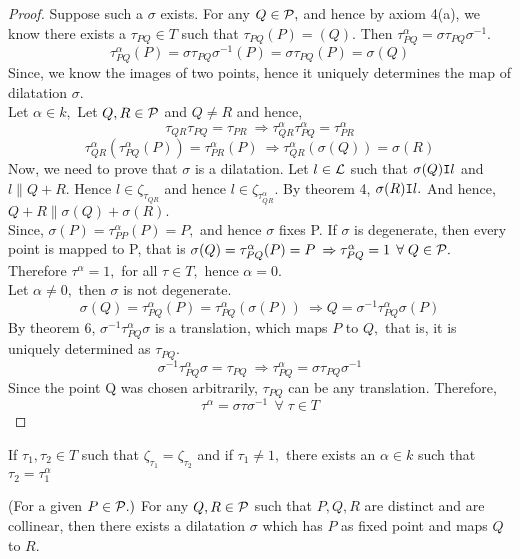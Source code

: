 \begin{proof}
    Suppose such a $\sigma$ exists. For any $Q \in \mathcal{P},$ and hence by axiom 4(a), we know there exists a $\tau_{PQ} \in T$ such that $\tau_{PQ}(P)=(Q).$ Then $\tau_{PQ}^\alpha = \sigma \tau_{PQ} \sigma^{-1} $.
    \[ 
    \tau_{PQ}^\alpha(P) = \sigma \tau_{PQ} \sigma^{-1}(P) = \sigma \tau_{PQ}(P) = \sigma (Q)
    \]
    Since, we know the images of two points, hence it uniquely determines the map of dilatation $\sigma$. \\
    Let $\alpha \in k,$  Let $Q, R \in \mathcal{P}$ and $Q \neq R$ and hence, 
    \[ \tau_{QR}\tau_{PQ}=\tau_{PR}  \: \Rightarrow \tau_{QR}^\alpha\tau_{PQ}^\alpha=\tau_{PR}^\alpha \]
    \[ \tau_{QR}^\alpha(\tau_{PQ}^\alpha (P))=\tau_{PR}^\alpha(P)   \: \Rightarrow \tau_{QR}^\alpha(\sigma(Q))=\sigma(R) \]   
    Now, we need to prove that $\sigma$ is a dilatation. Let $l \in \mathcal{L}$ such that $\sigma(Q) \texttt{I} l$ and $l \parallel Q+R.$ Hence $l \in \zeta_{\tau_{QR}} $ and hence $l \in \zeta_{\tau_{QR}^{\alpha}}. $ By theorem 4, $\sigma(R) \texttt{I} l.$ And hence, $Q+R \parallel \sigma(Q)+ \sigma(R).$ \\
    Since, $\sigma(P) = \tau_{PP}^\alpha(P)=P, $ and hence $\sigma$ fixes P. If $\sigma$ is degenerate, then every point is mapped to P, that is $\sigma(Q) = \tau_{PQ}^{\alpha}(P) = P \: \Rightarrow \tau_{PQ}^{\alpha} = 1 \: \: \forall \; Q \in \mathcal{P}.$ Therefore $\tau^\alpha = 1,$ for all $\tau \in T,$ hence $\alpha=0.$ \\
    Let $\alpha \neq 0,$ then $\sigma$ is not degenerate.
    \[
    \sigma(Q)=\tau_{PQ}^{\alpha}(P)= \tau_{PQ}^{\alpha}(\sigma(P)) \: \Rightarrow Q = \sigma^{-1}\tau_{PQ}^{\alpha}\sigma(P)
    \]
    By theorem 6, $\sigma^{-1}\tau_{PQ}^{\alpha}\sigma$ is a translation, which maps $P$ to $Q,$ that is, it is uniquely determined as $\tau_{PQ}.$
    \[
    \sigma^{-1}\tau_{PQ}^{\alpha}\sigma = \tau_{PQ} \: \Rightarrow \tau_{PQ}^{\alpha} = \sigma\tau_{PQ}\sigma^{-1}
    \]
    Since the point Q was chosen arbitrarily, $\tau_{PQ}$ can be any translation. Therefore,
    \[
    \tau^{\alpha} = \sigma\tau\sigma^{-1} \: \: \forall \; \tau \in T
    \]
\end{proof}

\begin{axiom}[4b]
    If $\tau_1, \tau_2 \in T $ such that $\zeta_{\tau_1} = \zeta_{\tau_2} $ and if $\tau_1 \neq 1,$ there exists an $\alpha \in k$ such that $\tau_2 = \tau_1^\alpha$  
\end{axiom}

\begin{axiom}[4b $P$]
    (For a given $P \in \mathcal{P}.)$ For any $Q,R \in \mathcal{P}$ such that $P, Q, R$ are distinct and are collinear, then there exists a dilatation $\sigma$ which has $P$ as fixed point and maps $Q$ to $R.$ 
\end{axiom}

